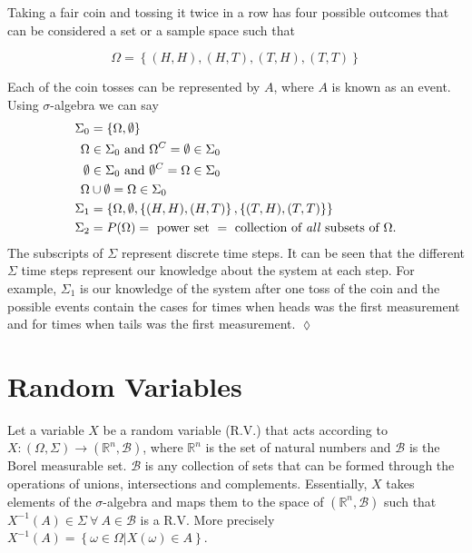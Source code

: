 \begin{example}%
\label{ex:cointoss}
Taking a fair coin and tossing it twice in a row has four possible outcomes that can be considered a set or a sample space such that

\begin{equation*}
\Omega = \left\lbrace (H,H), (H,T), (T,H), (T,T) \right\rbrace
\end{equation*}

Each of the coin tosses can be represented by $A$, where $A$ is known as an event.
Using $\sigma$-algebra we can say
\begin{align*}
\Sigma_0 &= \left\lbrace \Omega, \emptyset \right\rbrace \\
\Omega &\in \Sigma_0 \textnormal{~and~} \Omega^C = \emptyset \in \Sigma_0 \\
\emptyset &\in \Sigma_0 \textnormal{~and~} \emptyset^C = \Omega \in \Sigma_0 \\
\Omega &\cup \emptyset = \Omega \in \Sigma_0 \\
\Sigma_1 &= \left\lbrace \Omega, \emptyset, \left\lbrace (H,H), (H,T) \right\rbrace, \left\lbrace (T,H), (T,T) \right\rbrace \right\rbrace \\
\Sigma_2 &= P(\Omega) = \textnormal{~power~set~} = \textnormal{~collection~of~\textit{all}~subsets~of~} \Omega.
\end{align*}
The subscripts of $\Sigma$ represent discrete time steps.
It can be seen that the different $\Sigma$ time steps represent our knowledge about the system at each step.
For example, $\Sigma_1$ is our knowledge of the system after one toss of the coin and the possible events contain the cases for times when heads was the first measurement and for times when tails was the first measurement.
$\lozenge$
\end{example}

\section{Random Variables}
Let a variable $X$ be a random variable (R.V.) that acts according to \\
$X: (\Omega, \Sigma) \to (\mathbb{R}^n, \mathcal{B})$, where $\mathbb{R}^n$ is the set of natural numbers and $\mathcal{B}$ is the Borel measurable set.
$\mathcal{B}$ is any collection of sets that can be formed through the operations of unions, intersections and complements.
Essentially, $X$ takes elements of the $\sigma$-algebra and maps them to the space of $(\mathbb{R}^n, \mathcal{B})$ such that $X^{-1}(A) \in \Sigma~\forall~A \in \mathcal{B}$ is a R.V.
More precisely $X^{-1}(A) = \left\lbrace \omega \in \Omega | X(\omega) \in A \right\rbrace$.

